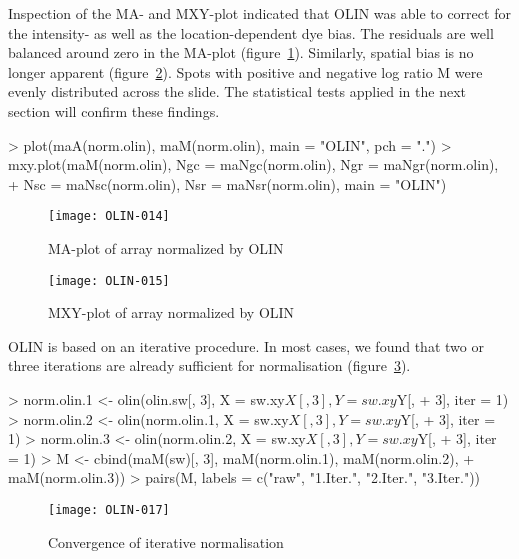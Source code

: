 \documentclass[a4paper,11pt]{article}
\begin{document}
Inspection of the MA- and MXY-plot indicated that OLIN  was able to correct for the  
intensity- as well as  the  location-dependent dye bias. The
 residuals are well  balanced around zero in the MA-plot (figure~\ref{maolin}).
Similarly, spatial bias is no longer apparent (figure~\ref{mxyolin}).
Spots with positive and negative log ratio M were evenly distributed across the slide. 
The statistical tests
applied in the next section will confirm  these findings. 

\begin{Schunk}
\begin{Sinput}
> plot(maA(norm.olin), maM(norm.olin), main = "OLIN", pch = ".")
> mxy.plot(maM(norm.olin), Ngc = maNgc(norm.olin), Ngr = maNgr(norm.olin), 
+     Nsc = maNsc(norm.olin), Nsr = maNsr(norm.olin), main = "OLIN")
\end{Sinput}
\end{Schunk}



\begin{figure}[t]
\centering
\texttt{[image: OLIN-014]}
\caption{MA-plot of array normalized by  OLIN }
\label{maolin}
\end{figure}



\begin{figure}
\centering
\texttt{[image: OLIN-015]}
\caption{MXY-plot of array normalized by  OLIN }
\label{mxyolin}
\end{figure}


OLIN is based on an iterative procedure. In most cases, we found
that two or three iterations are already sufficient for normalisation (figure~\ref{iter}).   


\begin{Schunk}
\begin{Sinput}
> norm.olin.1 <- olin(olin.sw[, 3], X = sw.xy$X[, 3], Y = sw.xy$Y[, 
+     3], iter = 1)
> norm.olin.2 <- olin(norm.olin.1, X = sw.xy$X[, 3], Y = sw.xy$Y[, 
+     3], iter = 1)
> norm.olin.3 <- olin(norm.olin.2, X = sw.xy$X[, 3], Y = sw.xy$Y[, 
+     3], iter = 1)
> M <- cbind(maM(sw)[, 3], maM(norm.olin.1), maM(norm.olin.2), 
+     maM(norm.olin.3))
> pairs(M, labels = c("raw", "1.Iter.", "2.Iter.", "3.Iter."))
\end{Sinput}
\end{Schunk}


\begin{figure}
\centering
\texttt{[image: OLIN-017]}


\caption{Convergence of iterative normalisation }
\label{iter}
\end{figure}
\end{document}
